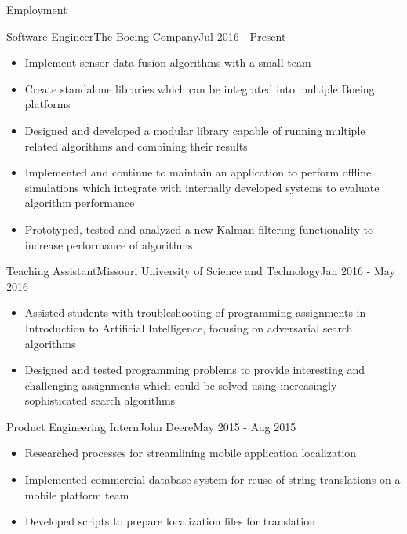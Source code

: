 \documentclass[]{mcdowellcv}
\begin{document}
\makeheader

\begin{cvsection}{Employment}

\begin{boeing}
    \begin{cvsubsection}{Software Engineer}{The Boeing Company}{Jul 2016 - Present}         
        \begin{itemize}
            \item Implement sensor data fusion algorithms with a small team
            \item Create standalone libraries which can be integrated into multiple Boeing platforms
            \item Designed and developed a modular library capable of running multiple related algorithms and combining their results
            \item Implemented and continue to maintain an application to perform offline simulations which integrate with internally developed systems to evaluate algorithm performance
            \item Prototyped, tested and analyzed a new Kalman filtering functionality to increase performance of algorithms
        \end{itemize}
    \end{cvsubsection}
\end{boeing}
    
\begin{aigrader}
    \begin{cvsubsection}[2]{Teaching Assistant}{Missouri University of Science and Technology}{Jan 2016 - May 2016}
        \begin{itemize}
            \item Assisted students with troubleshooting of programming assignments in Introduction to Artificial Intelligence, focusing on adversarial search algorithms
            \item Designed and tested programming problems to provide interesting and challenging assignments which could be solved using increasingly sophisticated search algorithms
        \end{itemize}
    \end{cvsubsection}
\end{aigrader}

\begin{johndeere}
    \begin{cvsubsection}{Product Engineering Intern}{John Deere}{May 2015 - Aug 2015}
        \begin{itemize}
            \item Researched processes for streamlining mobile application localization
            \item Implemented commercial database system for reuse of string translations on a mobile platform team
            \item Developed scripts to prepare localization files for translation
        \end{itemize}
    \end{cvsubsection}
\end{johndeere}
    

\end{cvsection}
\end{document}
